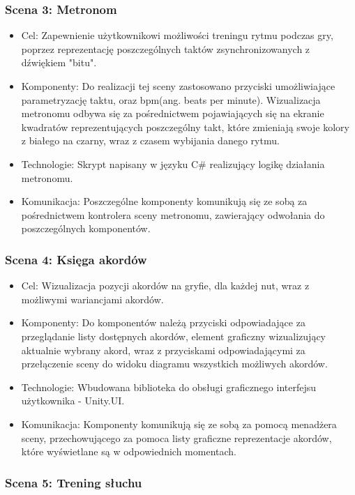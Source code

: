 \subsubsection{Scena 3: Metronom}

\begin{itemize}
\item Cel: Zapewnienie użytkownikowi możliwości treningu rytmu podczas gry, poprzez reprezentację poszczególnych taktów zsynchronizowanych z dźwiękiem "bitu".
\item Komponenty: Do realizacji tej sceny zastosowano przyciski umożliwiające parametryzację taktu, oraz bpm(ang. beats per minute). Wizualizacja metronomu odbywa się za pośrednictwem pojawiających się na ekranie kwadratów reprezentujących poszczególny takt, które zmieniają swoje kolory z białego na czarny, wraz z czasem wybijania danego rytmu.
\item Technologie: Skrypt napisany w języku C\# realizujący logikę działania metronomu.
\item Komunikacja: Poszczególne komponenty komunikują się ze sobą za pośrednictwem kontrolera sceny metronomu, zawierający odwołania do poszczególnych komponentów.
\end{itemize}

\subsubsection{Scena 4: Księga akordów}

\begin{itemize}
\item Cel: Wizualizacja pozycji akordów na gryfie, dla każdej nut, wraz z możliwymi wariancjami akordów.
\item Komponenty: Do komponentów należą przyciski odpowiadające za przeglądanie listy dostępnych akordów, element graficzny wizualizujący aktualnie wybrany akord, wraz z przyciskami odpowiadającymi za przełączenie sceny do widoku diagramu wszystkich możliwych akordów.
\item Technologie: Wbudowana biblioteka do obsługi graficznego interfejsu użytkownika - Unity.UI.
\item Komunikacja: Komponenty komunikują się ze sobą za pomocą menadżera sceny, przechowującego za pomoca listy graficzne reprezentacje akordów, które wyświetlane są w odpowiednich momentach. 
\end{itemize}

\subsubsection{Scena 5: Trening słuchu}

